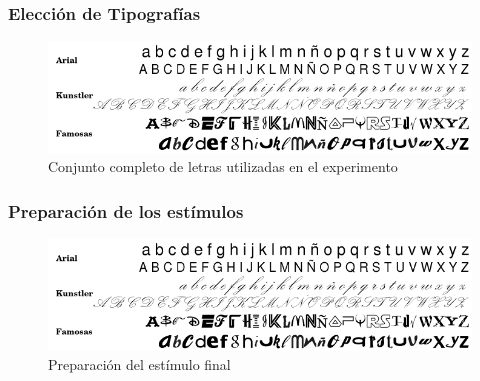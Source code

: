 \documentclass[10pt,presentation]{beamer}
\begin{document}
\begin{frame}
  \frametitle{Elecci\'on de Tipograf\'ias}
    \begin{figure}
    \includegraphics[scale=0.35]{graficos/letras.png}
      \caption{Conjunto completo de letras utilizadas en el experimento}
      \label{figura:conjuntoLetras}
    \end{figure}
\end{frame}

\begin{frame}
  \frametitle{Preparaci\'on de los est\'imulos}
    \begin{figure}
    \includegraphics[scale=0.35]{graficos/letras.png}
      \caption{Preparación del estímulo final}
      \label{figura:FISET1}
    \end{figure}
\end{frame}
\end{document}
